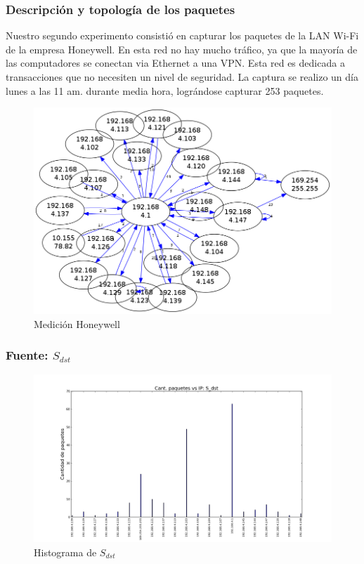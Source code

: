 \subsubsection{Descripción y topología de los paquetes}

Nuestro segundo experimento consistió en capturar los paquetes de la LAN Wi-Fi de la empresa Honeywell. En esta red no hay mucho tráfico, ya que la mayoría de las computadores se conectan via Ethernet a una VPN. Esta red es dedicada a transacciones que no necesiten un nivel de seguridad. La captura se realizo un día lunes a las 11 am. durante media hora, lográndose capturar 253 paquetes.  

\begin{figure}[H]
 \begin{center}
  \includegraphics[width=0.7\linewidth]{../imgs/red-honeywell_red.png}
  \caption{Medición Honeywell}
 \end{center}
\end{figure}


\subsubsection{Fuente: $S_{dst}$}

\begin{figure}[H]\centering
    \includegraphics[width=0.8\linewidth]{../imgs/red-honeywell_S_dst_hist.png}
    \caption{Histograma de $S_{dst}$}\label{fig:Honeywell-dst-hist}
\end{figure}

